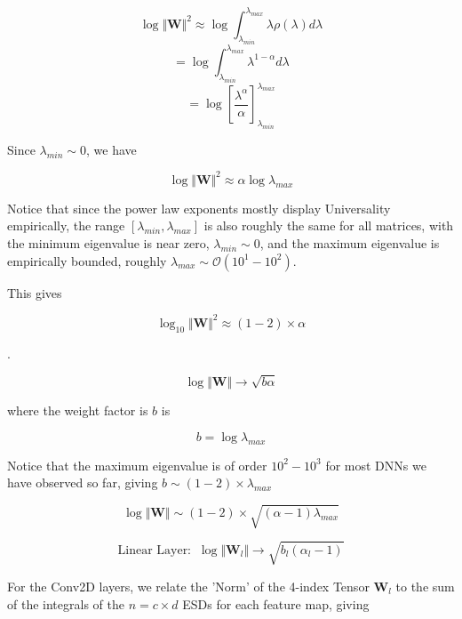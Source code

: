 $$\log\Vert\mathbf{W}\Vert^{2}\approx\log\int_{\lambda_{min}}^{\lambda_{max}}\lambda\rho(\lambda)d\lambda$$
$$=\log\int_{\lambda_{min}}^{\lambda_{max}}\lambda^{1-\alpha}d\lambda$$
$$=\log\left[\dfrac{\lambda^{\alpha}}{\alpha}\right]^{\lambda_{max}}_{\lambda_{min}}$$

Since $\lambda_{min}\sim 0$, we have 

$$\log\Vert\mathbf{W}\Vert^{2}\approx\alpha\log\lambda_{max}$$

Notice that since the power law exponents mostly display Universality empirically, the range $[\lambda_{min},\lambda_{max}]$ is also roughly the same for all matrices, with the minimum eigenvalue is near zero, $\lambda_{min}\sim 0$, and the maximum eigenvalue is  empirically bounded, roughly $\lambda_{max}\sim\mathcal{O}(10^{1}-10^{2})$.  

This gives 

$$\log_{10}\Vert\mathbf{W}\Vert^{2}\approx(1-2)\times\alpha$$



.  

$$\log\Vert\mathbf{W}\Vert\rightarrow \sqrt{b\alpha}$$

where the weight factor is $b$ is 

$$b=\log\lambda_{max}$$

Notice that the maximum eigenvalue is of order $10^{2}-10^{3}$ for  most DNNs we have observed so far, giving $b\sim(1-2)\times\lambda_{max}$

$$\log\Vert\mathbf{W}\Vert\sim(1-2)\times\sqrt{(\alpha-1)\lambda_{max}}$$



$$\text{Linear Layer:}\;\;\log\Vert\mathbf{W}_{l}\Vert\rightarrow\sqrt{b_{l}(\alpha_{l}-1)}$$

For the Conv2D layers, we relate the 'Norm' of the 4-index Tensor $\mathbf{W}_{l}$ to the sum of the integrals of the $n=c\times d$ ESDs for each feature map, giving 

